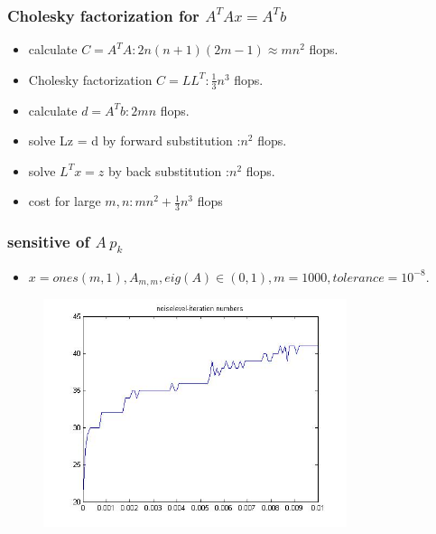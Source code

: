 \documentclass{beamer}
\begin{document}
\begin{frame}
\frametitle{Cholesky factorization for $A^{T}Ax=A^{T}b$}
\begin{itemize}
    \item calculate $C = A^{T}A :2n(n + 1)(2m - 1) \approx mn^{2}$ flops.
    \item Cholesky factorization $C = LL^{T}: \frac{1}{3}n^{3}$ flops.
    \item calculate $d = A^{T}b :2mn$ flops.
    \item solve Lz = d by forward substitution :$n^2$ flops.
    \item solve $L^{T}x = z$ by back substitution :$n^2$ flops.
    \item cost for large $m, n: mn^{2} + \frac{1}{3}n^3$ flops
\end{itemize}
\end{frame}

\begin{frame}
\frametitle{sensitive of $A~p_{k}$}
\begin{itemize}
    \item $x=ones(m,1),A_{m,m}, eig(A)\in (0,1), m=1000, tolerance=10^{-8}$.
\end{itemize}

\begin{figure}[htbp]
\begin{minipage}[b]{0.8\linewidth}
\includegraphics[width=3.5in]{Images/noiselevel_iteration}
\end{minipage}
\end{figure}
\end{frame}
\end{document}
